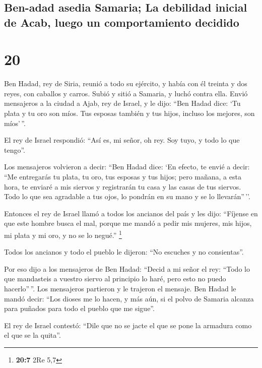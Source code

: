 \hypertarget{ben-adad-asedia-samaria-la-debilidad-inicial-de-acab-luego-un-comportamiento-decidido}{%
\subsection{Ben-adad asedia Samaria; La debilidad inicial de Acab, luego
un comportamiento
decidido}\label{ben-adad-asedia-samaria-la-debilidad-inicial-de-acab-luego-un-comportamiento-decidido}}

\hypertarget{section-19}{%
\section{20}\label{section-19}}

 Ben Hadad, rey de Siria, reunió a todo su ejército, y
había con él treinta y dos reyes, con caballos y carros. Subió y sitió a
Samaria, y luchó contra ella.  Envió mensajeros a la
ciudad a Ajab, rey de Israel, y le dijo: ``Ben Hadad dice:
 `Tu plata y tu oro son míos. Tus esposas también y tus
hijos, incluso los mejores, son míos'\,''.

 El rey de Israel respondió: ``Así es, mi señor, oh rey.
Soy tuyo, y todo lo que tengo''.

 Los mensajeros volvieron a decir: ``Ben Hadad dice: `En
efecto, te envié a decir: ``Me entregarás tu plata, tu oro, tus esposas
y tus hijos;  pero mañana, a esta hora, te enviaré a mis
siervos y registrarán tu casa y las casas de tus siervos. Todo lo que
sea agradable a tus ojos, lo pondrán en su mano y se lo llevarán''\,''.

 Entonces el rey de Israel llamó a todos los ancianos del
país y les dijo: ``Fíjense en que este hombre busca el mal, porque me
mandó a pedir mis mujeres, mis hijos, mi plata y mi oro, y no se lo
negué.'' \footnote{\textbf{20:7} 2Re 5,7}

 Todos los ancianos y todo el pueblo le dijeron: ``No
escuches y no consientas''.

 Por eso dijo a los mensajeros de Ben Hadad: ``Decid a mi
señor el rey: ``Todo lo que mandasteis a vuestro siervo al principio lo
haré, pero esto no puedo hacerlo''\,''. Los mensajeros partieron y le
trajeron el mensaje.  Ben Hadad le mandó decir: ``Los
dioses me lo hacen, y más aún, si el polvo de Samaria alcanza para
puñados para todo el pueblo que me sigue''.

 El rey de Israel contestó: ``Dile que no se jacte el que
se pone la armadura como el que se la quita''.

